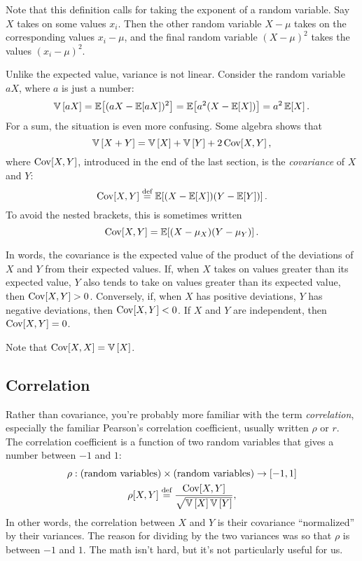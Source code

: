 Note that this definition calls for taking the exponent of a random variable.
Say $X$ takes on some values $x_i$. Then the other random variable $X - \mu$
takes on the corresponding values $x_i - \mu$, and the final random variable
$(X - \mu)^2$ takes the values $(x_i - \mu)^2$.

Unlike the expected value, variance is not linear. Consider the random variable $aX$,
where $a$ is just a number:
\begin{equation}
\mathbb{V}\left[{aX}\right] = \mathbb{E}\!\left[{(aX - \mathbb{E}\!\left[{aX}\right])^2}\right] = \mathbb{E}\!\left[{a^2(X - \mathbb{E}\!\left[{X}\right])}\right] = a^2 \, \mathbb{E}\!\left[{X}\right].
\end{equation}
For a sum, the situation is even more confusing. Some algebra shows that
\begin{equation*}
\mathbb{V}\left[{X + Y}\right] = \mathbb{V}\left[{X}\right] + \mathbb{V}\left[{Y}\right] + 2 \,\mathrm{Cov}\!\left[{X, Y}\right],
\end{equation*}
where $\mathrm{Cov}\!\left[{X, Y}\right]$, introduced in the end of the last section, is the
\emph{covariance} of $X$ and $Y$:
\begin{equation}
\mathrm{Cov}\!\left[{X, Y}\right] \stackrel{\text{def}}{=} \mathbb{E}\!\left[{(X - \mathbb{E}\!\left[{X}\right])(Y - \mathbb{E}\!\left[{Y}\right])}\right].
\end{equation}
To avoid the nested brackets, this is sometimes written
\begin{equation}
\mathrm{Cov}\!\left[{X, Y}\right] = \mathbb{E}\!\left[{(X - \mu_X)(Y - \mu_Y)}\right].
\end{equation}

In words, the covariance is the expected value of the product of the
deviations of $X$ and $Y$ from their expected values. If, when $X$ takes on
values greater than its expected value, $Y$ also tends to take on values
greater than its expected value, then $\mathrm{Cov}\!\left[{X, Y}\right] > 0$. Conversely, if, when
$X$ has positive deviations, $Y$ has negative deviations, then $\mathrm{Cov}\!\left[{X, Y}\right] <
0$. If $X$ and $Y$ are independent, then $\mathrm{Cov}\!\left[{X, Y}\right] = 0$.

Note that $\mathrm{Cov}\!\left[{X, X}\right] = \mathbb{V}\left[{X}\right]$.

\subsection{Correlation}

Rather than covariance, you're probably more familiar with the term
\emph{correlation}, especially the familiar Pearson's correlation coefficient,
usually written $\rho$ or $r$. The correlation coefficient is a function of
two random variables that gives a number between $-1$ and $1$:
\begin{gather*}
\rho : (\text{random variables}) \times (\text{random variables}) \to [-1, 1] \\
\rho[X, Y] \stackrel{\text{def}}{=} \frac{\mathrm{Cov}\!\left[{X, Y}\right]}{\sqrt{\mathbb{V}\left[{X}\right] \mathbb{V}\left[{Y}\right]}},
\end{gather*}
In other words, the correlation between $X$ and $Y$ is their covariance
``normalized'' by their variances. The reason for dividing by the two
variances was so that $\rho$ is between $-1$ and $1$. The math isn't hard, but
it's not particularly useful for us.

